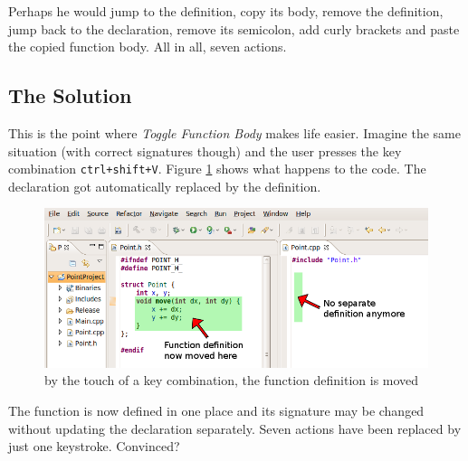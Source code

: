 Perhaps he would jump to the definition, copy its body, remove the definition, 
jump back to the declaration, remove its semicolon, add curly brackets and paste 
the copied function body. All in all, seven actions.

\subsection{The Solution}
This is the point where \textit{Toggle Function Body} makes life easier. Imagine 
the same situation (with correct signatures though) and the user presses the key 
combination \texttt{ctrl+shift+V}. Figure \ref{coolResult} shows what happens to 
the code. The declaration got automatically replaced by the definition.

\begin{figure}[h]
\centering
\includegraphics[width=\textwidth]{images/resulting_function.png}
\caption{by the touch of a key combination, the function definition is moved}
\label{coolResult}
\end{figure}

The function is now defined in one place and its signature may be changed 
without updating the declaration separately. Seven actions have been replaced by 
just one keystroke. Convinced?

